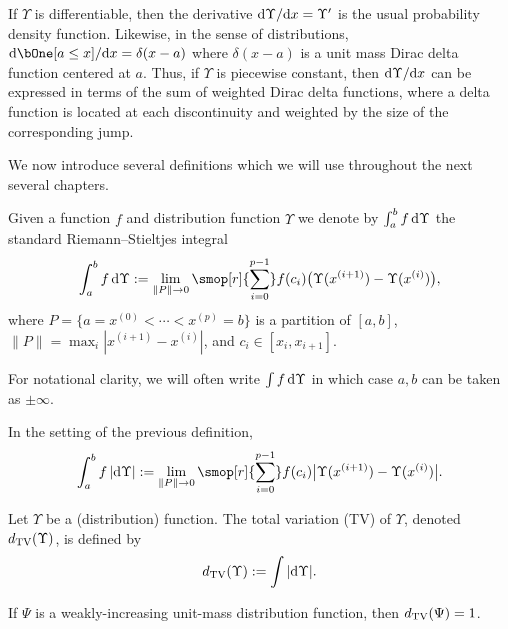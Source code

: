\begin{remark}
    If \( \Upsilon \) is differentiable, then the derivative \( \textup{d}\Upsilon / \textup{d}{x} = \Upsilon' \) is the usual probability density function.
    Likewise, in the sense of distributions, \( \d\bOne[a \leq x] /\d{x} = \delta(x-a) \) where \( \delta(x-a) \) is a unit mass Dirac delta function centered at \( a \).
    Thus, if \( \Upsilon \) is piecewise constant, then \( \textup{d}\Upsilon/\textup{d}{x} \) can be expressed in terms of the sum of weighted Dirac delta functions, where a delta function is located at each discontinuity and weighted by the size of the corresponding jump.
\end{remark}

We now introduce several definitions which we will use throughout the next several chapters.
\begin{definition}
    Given a function \( f \) and distribution function \( \Upsilon \) we denote by 
        \( 
        \int_{a}^{b} f \,\textup{d} \Upsilon
        \) the standard Riemann--Stieltjes integral%
        \begin{equation*}
            \int_a^b f \,\d \Upsilon
            := \lim_{\|P\|\to 0} \smop[r]{\sum_{i=0}^{p-1}} f(c_i) \big( \Upsilon(x^{(i+1)}) - \Upsilon(x^{(i)}) \big),
        \end{equation*}
        where \( P = \{ a = x^{(0)} < \cdots < x^{(p)} = b \} \) is a partition of \( [a,b] \), \( \| P \| = \max_i | x^{(i+1)} - x^{(i)}| \), and \( c_i \in [x_i,x_{i+1}] \).

    For notational clarity, we will often write 
    \(
    \int f \,\textup{d} \Upsilon
    \)
    in which case \( a,b \) can be taken as \( \pm \infty \).%
\end{definition}


\begin{definition}
    In the setting of the previous definition,
    \begin{equation*}
        \int_{a}^{b} f \, |\d \Upsilon|
        := \lim_{\|P\|\to 0} \smop[r]{\sum_{i=0}^{p-1}} f(c_i) \big| \Upsilon(x^{(i+1)}) - \Upsilon(x^{(i)}) \big|.
    \end{equation*}
\end{definition}

\begin{definition}
    Let \( \Upsilon \) be a (distribution) function.
The total variation (TV) of \( \Upsilon \), denoted \( d_{\mathrm{TV}}(\Upsilon) \), is defined by
\begin{equation*}
    d_{\mathrm{TV}}(\Upsilon) := \int |\textup{d} \Upsilon|.
\end{equation*}
\end{definition}
\begin{remark}
If \( \Psi \) is a weakly-increasing unit-mass distribution function, then \( d_{\mathrm{TV}}(\Psi) = 1 \). 
\end{remark}

